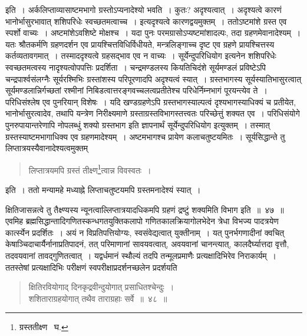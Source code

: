 \documentclass[11pt, openany]{book}
\begin{document}
\indent इति~। अर्कलिप्ताव्यासाष्टमभागो ग्रस्तोऽप्यनादेश्यो भवति~। कुतः? अदृश्यत्वात्~। अदृश्यत्वे कारणं भानोर्भासुरभावात् शशिपरिधेः स्वच्छतमत्वाच्च~। इत्यदृश्यत्वे कारणद्वयमुक्तम्~। ततोऽष्टमांशे ग्रस्त एव स्पर्शो वाच्यः~। अष्टमांशेऽवशिष्टे मोक्षश्च~। यदा पुनः परमग्रासोऽप्यष्टमांशादल्पः, तदा ग्रहणमेवानादेश्यम्~। यतः श्रौतकर्मणि ग्रहणदर्शन एव प्रायश्चित्तविधिर्विधीयते, मन्त्रलिङ्गाच्च दृष्ट एव
ग्रहणे प्रायश्चित्तस्य कर्तव्यतावगमात्~। तस्माददृश्यत्वे ग्रहसद्भाव एव न वाच्यः~। {\qt सूर्येन्दुपरिधियोग} इत्यनेन शशिपरिधेः स्वच्छतमत्वस्य नादृश्यत्वोपपत्तिः प्रदर्शिता~। चन्द्रमण्डलस्य कियतिचिदंशे सूर्यमण्डलं प्रविष्टेऽपि चन्द्रपार्श्वसंलग्नैः सूर्यरश्मिभिः ग्रस्तांशस्य परिपूरणादपि
अदृश्यत्वं स्यात्~। ग्रस्तभागस्य सूर्यस्यातिभासुरत्वात् सूर्यमण्डलान्निर्गच्छतां रश्मीनां निबिडत्वात्तरङ्गवच्चलत्वप्रतीतेश्च परिधेर्निम्नभागं पूरयन्त्येव
ते~। परिधिसंश्लेष एव पुनरियान् विशेषः~। यदि खण्डग्रहणेऽपि ग्रस्तभागस्याल्पत्वं दृश्यभागस्याधिक्यं च प्रतीयेत, भानोर्भासुरत्वादेव,
तथापि यन्त्रेण निरीक्ष्यमाणे ग्रस्ताग्रस्तविभागस्तत्त्वतः परिच्छेत्तुं शक्यत एव~। परिधिसंयोगे पुनरुपायान्तरेणापि नोपलब्धुं शक्यो ग्रस्तभाग
इति ज्ञापनार्थं सूर्येन्दुपरिधियोग इत्युक्तम्~। तस्मात् ग्रस्तस्याष्टमभागाधिक्य एव ग्रहणमादेश्यम्~। अष्टमभागश्च प्रायेण कलाचतुष्टयमितः~।
सूर्यसिद्धान्ते तु लिप्तात्रयस्यैवानादेश्यत्वमुक्तम्\textendash 
\begin{quote}
{\qt लिप्तात्रयमपि ग्रस्तं तीक्ष्ण\renewcommand{\thefootnote}{२}\footnote{ग्रस्ततीक्ष्ण \textendash\ घ.}त्वान्न विवस्वतः~।} 
\end{quote}

\noindent इति~। ततो मन्यामहे मध्याह्ने लिप्ताचतुष्टयमपि ग्रस्तमनादेश्यं स्यात्~। 

\newpage

\noindent क्षितिजासन्नत्वे तु तैक्ष्ण्यस्य न्यूनत्वाल्लिप्तात्रयादधिकमपि ग्रहणं द्रष्टुं शक्यमिति विभाग इति~॥~४७~॥\\
	
\indent एवमिह ब्रह्मसिद्धान्तादिगणितस्कन्धगतयुक्तिकलापो गणितकालक्रियागोलभेदेन त्रेधा विभज्य पादत्रयेण कार्त्स्येन प्रदर्शितः~। अयं न
विप्रतिपत्तियोग्यः, स्वसंवेद्यत्वात् युक्तीनाम्~। यत् पुनर्भगणादीनां क्वचित् केषाञ्चिदाचार्यैर्नानाप्रतिपादनं, तत् परिमाणानां सावयवत्वात्, अवयवानां चानन्त्यात्, कालदैर्घ्यात्तदा वृत्तौ, तदवयवानां तावद्गुणितत्वात्~। यद्वर्धमानं स्थौल्यं तदपि तन्मूलप्रमाणैः प्रत्यक्षादिभिरेव निराकार्यम्~। ततस्तेषां प्रत्यक्षादिभिः परीक्षणं स्वपरीक्षाप्रदर्शनच्छलेन प्रदर्शयति\textendash 
\begin{quote}
{\qt क्षितिरवियोगाद् दिनकृद्रवीन्दुयोगात् प्रसाधितश्चेन्दुः~।\\
	शशिताराग्रहयोगात् तथैव ताराग्रहाः सर्वे~॥~४८~॥} 
\end{quote}
\end{document}
